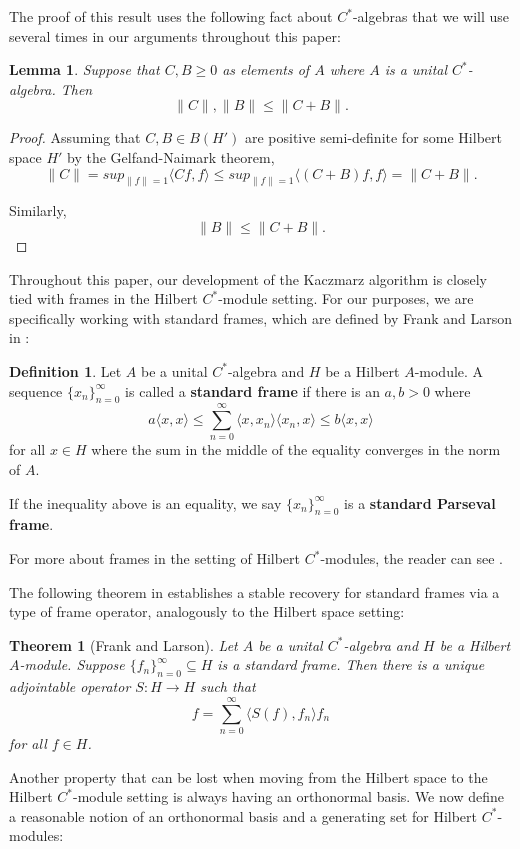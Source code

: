 \documentclass[11pt]{amsart}
\newtheorem*{thm*}{Theorem}
\newtheorem{lem}[thm]{Lemma}
\theoremstyle{definition}
\newtheorem{defn}[thm]{Definition}
\numberwithin{equation}{section}
\begin{document}
The proof of this result uses the following fact about $C^{*}$-algebras that we will use several times in our arguments throughout this paper:
\begin{lem}\label{normdeclem}
Suppose that $C,B\geq 0$ as elements of $A$ where $A$ is a unital $C^{*}$-algebra. Then 
$$\|C\|, \|B\|\leq \|C+B\|.$$
\end{lem}
\begin{proof}
Assuming that $C,B\in B(H')$ are positive semi-definite for some Hilbert space $H'$ by the Gelfand-Naimark theorem,
$$\|C\|=sup_{\|f\|=1}\langle Cf, f\rangle \leq sup_{\|f\|=1}\langle (C+B)f, f\rangle=\|C+B\|.$$

Similarly, $$\|B\|\leq \|C+B\|.$$
\end{proof}

Throughout this paper, our development of the Kaczmarz algorithm is closely tied with frames in the Hilbert $C^{*}$-module setting. For our purposes, we are specifically working with standard frames, which are defined by Frank and Larson in \cite{Frank2002Frames}:
\begin{defn}
Let $A$ be a unital $C^{*}$-algebra and $H$ be a Hilbert $A$-module. A sequence $\{x_{n}\}_{n=0}^{\infty}$ is called a \textbf{standard frame} if
there is an $a,b>0$ where
$$a\langle x, x\rangle \leq \sum_{n=0}^{\infty}\langle x, x_{n}\rangle \langle x_{n}, x\rangle \leq b\langle x, x\rangle$$
for all $x\in H$ where the sum in the middle of the equality converges in the norm of $A$.

If the inequality above is an equality, we say $\{x_{n}\}_{n=0}^{\infty}$ is a \textbf{standard Parseval frame}.
\end{defn} For more about frames in the setting of Hilbert $C^{*}$-modules, the reader can see \cite{Arambasic2017Frames}.

The following theorem in \cite{Frank2002Frames} establishes a stable recovery for standard frames via a type of frame operator, analogously to the Hilbert space setting:

\begin{thm*}[Frank and Larson]
Let $A$ be a unital $C^{*}$-algebra and $H$ be a Hilbert $A$-module. Suppose $\{f_{n}\}_{n=0}^{\infty}\subseteq H$ is a standard frame. Then there is a unique adjointable operator $S: H\to H$ such that
$$f=\sum_{n=0}^{\infty}\langle S(f), f_{n}\rangle f_{n}$$
for all $f\in H$.
\end{thm*}

Another property that can be lost when moving from the Hilbert space to the Hilbert $C^{*}$-module setting is always having an orthonormal basis.
We now define a reasonable notion of an orthonormal basis and a generating set for Hilbert $C^{*}$-modules: 
\end{document}
